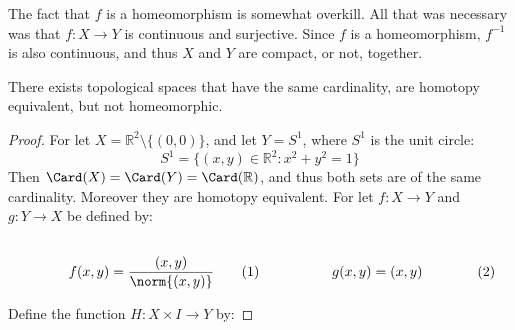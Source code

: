             The fact that $f$ is a homeomorphism is somewhat overkill.
            All that was necessary was that $f:X\rightarrow{Y}$ is continuous
            and surjective. Since $f$ is a homeomorphism, $f^{-1}$ is also
            continuous, and thus $X$ and $Y$ are compact, or not, together.
            \begin{theorem}
                \label{thm:Homotopy_Equivalance_of_Plane_without_point_%
                       and_unit_disc_but_not_homeomorphic}
                There exists topological spaces that have the same cardinality,
                are homotopy equivalent, but not homeomorphic.
            \end{theorem}
            \begin{proof}
                For let $X=\mathbb{R}^{2}\setminus\{(0,0)\}$,
                and let $Y=S^{1}$, where $S^{1}$ is the unit circle:
                \begin{equation}
                    S^{1}=\{(x,y)\in\mathbb{R}^{2}:x^{2}+y^{2}=1\}
                \end{equation}
                Then $\Card(X)=\Card(Y)=\Card(\mathbb{R})$, and thus
                both sets are of the same cardinality. Moreover they
                are homotopy equivalent. For let $f:{X}\rightarrow{Y}$ and
                $g:{Y}\rightarrow{X}$ be defined by:
                \par
                \begin{subequations}
                    \begin{minipage}[b]{0.49\textwidth}
                        \centering
                        \begin{equation}
                            f(x,y)=\frac{(x,y)}{\norm{(x,y)}}
                        \end{equation}
                    \end{minipage}
                    \hfill
                    \begin{minipage}[b]{0.49\textwidth}
                        \centering
                        \begin{equation}
                            g(x,y)=(x,y)
                        \end{equation}
                    \end{minipage}
                \end{subequations}
                \par\vspace{2.5ex}
                Define the function $H:X\times{I}\rightarrow{Y}$ by:

\end{proof}
